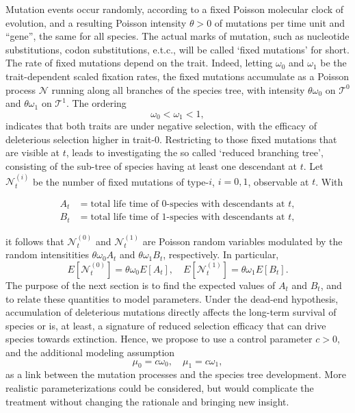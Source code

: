 \documentclass[a4paper,11pt]{article}
\theoremstyle{plain}
\theoremstyle{definition}
\numberwithin{equation}{section}
\begin{document}
Mutation events occur randomly, according to a fixed Poisson molecular clock
of evolution, and a resulting Poisson intensity $\theta>0$ of mutations
per time unit and ``gene'', the same for all species.  The actual
marks of mutation, such as nucleotide substitutions, codon
substitutions, e.t.c., will be called `fixed mutations' for short. The rate
of fixed mutations depend on the trait. Indeed, letting 
$\omega_0$ and $\omega_1$ be the trait-dependent scaled fixation rates,
the fixed mutations accumulate as a Poisson process $\mathcal{N}$ running along
all branches of the species tree, with intensity $\theta\omega_0$ on
$\mathcal T^0$ and $\theta\omega_1$ on $\mathcal T^1$. The ordering
\begin{equation}\nonumber
 \omega_0<\omega_1<1,
\end{equation}
indicates that both traits are under negative selection, with the
efficacy of deleterious selection higher in trait-$0$.  Restricting to
those fixed mutations that are visible at $t$, leads to investigating
the so called `reduced branching tree', consisting of the sub-tree of
species having at least one descendant at $t$.  Let $\mathcal{N}^{(i)}_t$ be the
number of fixed mutations of type-$i$, $i=0,1$, observable at $t$. With 

\begin{align*}
A_t&=\mbox{total life time of $0$-species with descendants at $t$},\\ 
B_t&=\mbox{total life time of $1$-species with descendants at $t$},
\end{align*}

\noindent it follows that $\mathcal{N}^{(0)}_t$ and $\mathcal{N}^{(1)}_t$ are Poisson random
variables modulated by the random intensitities $\theta \omega_0 A_t$
and $\theta \omega_1 B_t$, respectively.  In particular, 
\[
E[\mathcal{N}^{(0)}_t]=\theta \omega_0 E[A_t],\quad
E[\mathcal{N}^{(1)}_t]=\theta \omega_1 E[B_t].
\]
The purpose of the next section is to find the expected values of
$A_t$ and $B_t$, and to relate these quantities to model parameters.
Under the dead-end hypothesis, accumulation of deleterious mutations
directly affects the long-term survival of species or is, at least, a
signature of reduced selection efficacy that can drive species towards
extinction. Hence, we propose to use a control parameter $c>0$, 
and the additional modeling assumption
\begin{equation}\label{c}
\mu_0=c\omega_0,\quad \mu_1=c\omega_1,
\end{equation}
as a link between the mutation processes and the species tree
development. More realistic parameterizations could be considered, but
would complicate the treatment without changing the rationale and
bringing new insight.
\end{document}
